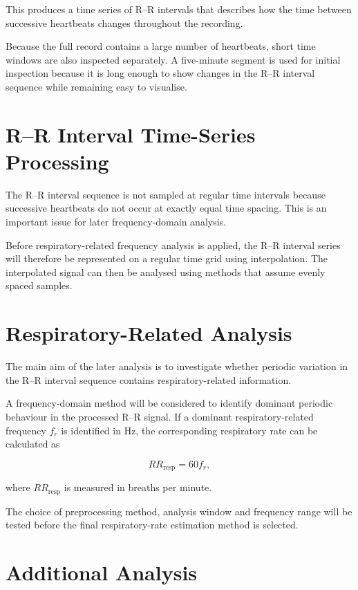 \documentclass[a4paper,10.5pt,oneside]{report}
\begin{document}
This produces a time series of R--R intervals that describes how the time
between successive heartbeats changes throughout the recording.

Because the full record contains a large number of heartbeats, short time
windows are also inspected separately. A five-minute segment is used for
initial inspection because it is long enough to show changes in the R--R
interval sequence while remaining easy to visualise.

\section{R--R Interval Time-Series Processing}

The R--R interval sequence is not sampled at regular time intervals because
successive heartbeats do not occur at exactly equal time spacing. This is an
important issue for later frequency-domain analysis.

Before respiratory-related frequency analysis is applied, the R--R interval
series will therefore be represented on a regular time grid using interpolation.
The interpolated signal can then be analysed using methods that assume evenly
spaced samples.

\section{Respiratory-Related Analysis}

The main aim of the later analysis is to investigate whether periodic variation
in the R--R interval sequence contains respiratory-related information.

A frequency-domain method will be considered to identify dominant periodic
behaviour in the processed R--R signal. If a dominant respiratory-related
frequency $f_r$ is identified in Hz, the corresponding respiratory rate can be
calculated as

\begin{equation}
RR_{\mathrm{resp}} = 60 f_r ,
\end{equation}

where $RR_{\mathrm{resp}}$ is measured in breaths per minute.

The choice of preprocessing method, analysis window and frequency range will be
tested before the final respiratory-rate estimation method is selected.

\section{Additional Analysis}
\end{document}

